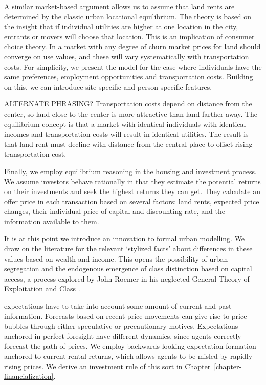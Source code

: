 A similar market-based argument allows us to assume that land rents are determined by the classic urban locational equilibrium. The theory is based on the insight that if individual utilities are higher at one location in the city, entrants or movers will choose that  location. This is an implication of consumer choice theory. In a market with any degree of churn market prices for land should converge on use values, and these will vary systematically with transportation costs. For simplicity, we present the model for the case where individuals have the same preferences, employment opportunities and transportation costs. Building on this, %
we can introduce site-specific and person-specific features. 

ALTERNATE PHRASING? Transportation costs depend on distance from the center, so land close to the center is more attractive than land farther away.  The equilibrium concept is that a market with identical individuals with identical incomes and transportation costs will result in identical utilities. The result is that land rent must decline with distance from the central place to offset rising transportation cost. 

Finally, we employ \gls{equilibrium reasoning} in the housing and investment process. We assume investors behave rationally in that they estimate the potential returns on their investments and seek the highest returns they can get. They calculate an offer price in each transaction based on several factors: land rents, expected price changes, their individual price of capital and discounting rate, and the information available to them.

It is at this point we introduce an innovation to formal urban modelling. We draw on the literature for the relevant `\gls{stylized facts}' about differences in these values based on wealth and income. This opens the possibility of urban segregation and the endogenous emergence of \gls{class} distinction based on capital access, a process explored by John Roemer in his neglected General Theory of Exploitation and Class \cite{roemerGeneralTheoryExploitation1982}.  

\Gls{expectations} have to take into account some amount of current and past information. Forecasts based on recent price movements can give rise to \gls{price bubble}s through either speculative or precautionary motives. Expectations anchored in \gls{perfect foresight} have different dynamics, since agents correctly forecast the path of prices.\cite{muthRationalExpectationsTheory1961} We employ backwards-looking expectation formation anchored 
to current rental returns, which allows agents to be misled by rapidly rising prices. We derive an investment rule of this sort in Chapter~\ref{chapter-financialization}. 

